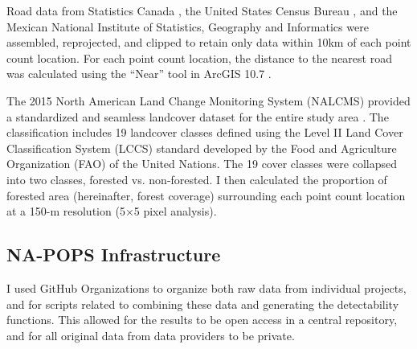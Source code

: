 \par Road data from Statistics Canada \citep{statistics_canada_intercensal_2019}, the United States Census Bureau \citep{us_geological_survey_usgs_2020}, and the Mexican National Institute of Statistics, Geography and Informatics \citep{national_institute_of_statistics_geography_and_informatics_communication_2019} were assembled, reprojected, and clipped to retain only data within 10km of each point count location. For each point count location, the distance to the nearest road was calculated using the “Near” tool in ArcGIS 10.7 \citep{environmental_systems_research_institute_arcgis_2011}. 

\par The 2015 North American Land Change Monitoring System (NALCMS) provided a standardized and seamless landcover dataset for the entire study area \citep{natural_resources_canada_2010-2015_2020}. The classification includes 19 landcover classes defined using the Level II Land Cover Classification System (LCCS) standard developed by the Food and Agriculture Organization (FAO) of the United Nations. The 19 cover classes were collapsed into two classes, forested vs. non-forested. I then calculated the proportion of forested area (hereinafter, forest coverage) surrounding each point count location at a 150-m resolution (5×5 pixel analysis).

\subsection{NA-POPS Infrastructure}
\par I used GitHub Organizations \citep{braga_not_2023} to organize both raw data from individual projects, and for scripts related to combining these data and generating the detectability functions. This allowed for the results to be open access in a central repository, and for all original data from data providers to be private.

